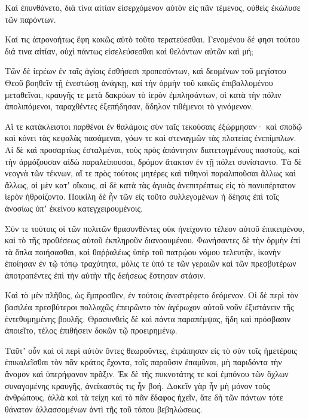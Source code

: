 {Καὶ ἐπυνθάνετο, διὰ τίνα αἰτίαν εἰσερχόμενον αὐτὸν εἰς πᾶν τέμενος, οὐθεὶς ἐκώλυσε τῶν παρόντων.
\par }{\PP {}Καί τις ἀπρονοήτως ἔφη κακῶς αὐτὸ τοῦτο τερατεύεσθαι.
Γενομένου δέ φησι τούτου διά τινα αἰτίαν, οὐχὶ πάντως εἰσελεύσεσθαι καὶ θελόντων αὐτῶν καὶ μή;
\par }{\PP {}Τῶν δὲ ἱερέων ἐν ταῖς ἁγίαις ἐσθήσεσι προπεσόντων, καὶ δεομένων τοῦ μεγίστου Θεοῦ βοηθεῖν τῇ ἐνεστώσῃ ἀνάγκῃ, καί τὴν ὁρμὴν τοῦ κακῶς ἐπιβαλλομένου μεταθεῖναι, κραυγῆς τε μετὰ δακρύων τὸ ἱερὸν ἐμπλησάντων,
οἱ κατὰ τὴν πόλιν ἀπολιπόμενοι, ταραχθέντες ἐξεπήδησαν, ἄδηλον τιθέμενοι τὸ γινόμενον.
\par }{\PP {}Αἵ τε κατάκλειστοι παρθένοι ἐν θαλάμοις σὺν ταῖς τεκούσαις ἐξώρμησαν· καὶ σποδῷ καὶ κόνει τὰς κεφαλὰς πασάμεναι, γόων τε καὶ στεναγμῶν τὰς πλατείας ἐνεπίμπλων.
Αἱ δὲ καὶ προσαρτίως ἐσταλμέναι, τοὺς πρὸς ἀπάντησιν διατεταγμένους παστοὺς, καὶ τὴν ἁρμόζουσαν αἰδὼ παραλείπουσαι, δρόμον ἄτακτον ἐν τῇ πόλει συνίσταντο.
Τὰ δὲ νεογνὰ τῶν τέκνων, αἵ τε πρὸς τούτοις μητέρες καὶ τιθηνοὶ παραλιποῦσαι ἄλλως καὶ ἄλλως, αἱ μὲν κατʼ οἴκους, αἱ δὲ κατὰ τὰς ἀγυιὰς ἀνεπιτρέπτως εἰς τὸ πανυπέρτατον ἱερὸν ἠθροίζοντο.
Ποικίλη δὲ ἦν τῶν εἰς τοῦτο συλλεγομένων ἡ δέησις ἐπὶ τοῖς ἀνοσίως ὑπʼ ἐκείνου κατεγχειρουμένοις.
\par }{\PP {}Σύν τε τούτοις οἱ τῶν πολιτῶν θρασυνθέντες οὐκ ἠνείχοντο τέλεον αὐτοῦ ἐπικειμένου, καὶ τὸ τῆς προθέσεως αὐτοῦ ἐκπληροῦν διανοουμένου.
Φωνήσαντες δὲ τὴν ὁρμὴν ἐπὶ τὰ ὅπλα ποιήσασθαι, καὶ θαῤῥαλέως ὑπὲρ τοῦ πατρῴου νόμου τελευτᾷν, ἱκανὴν ἐποίησαν ἐν τῷ τόπῳ τραχύτητα, μόλις τε ὑπό τε τῶν γεραιῶν καὶ τῶν πρεσβυτέρων ἀποτραπέντες ἐπὶ τὴν αὐτὴν τῆς δεήσεως ἔστησαν στάσιν.
\par }{\PP {}Καὶ τὸ μὲν πλῆθος, ὡς ἔμπροσθεν, ἐν τούτοις ἀνεστρέφετο δεόμενον.
Οἱ δὲ περὶ τὸν βασιλέα πρεσβύτεροι πολλαχῶς ἐπειρῶντο τὸν ἀγέρωχον αὐτοῦ νοῦν ἐξιστάνειν τῆς ἐντεθυμημένης βουλῆς.
Θρασυνθεὶς δὲ καὶ πάντα παραπέμψας, ἤδη καὶ πρόσβασιν ἀποιεῖτο, τέλος ἐπιθήσειν δοκῶν τῷ προειρημένῳ.
\par }{\PP {}Ταῦτʼ οὖν καὶ οἱ περὶ αὐτὸν ὄντες θεωροῦντες, ἐτράπησαν εἰς τὸ σὺν τοῖς ἡμετέροις ἐπικαλεῖσθαι τὸν πᾶν κράτος ἔχοντα, τοῖς παροῦσιν ἐπαμῦναι, μὴ παριδόντα τὴν ἄνομον καὶ ὑπερήφανον πρᾶξιν.
Ἐκ δὲ τῆς πυκνοτάτης τε καὶ ἐμπόνου τῶν ὄχλων συναγομένης κραυγῆς, ἀνείκαστός τις ἦν βοή.
Δοκεῖν γὰρ ἦν μὴ μόνον τοὺς ἀνθρώπους, ἀλλὰ καὶ τὰ τείχη καὶ τὸ πᾶν ἔδαφος ἠχεῖν, ἅτε δὴ τῶν πάντων τότε θάνατον ἀλλασσομένων ἀντὶ τῆς τοῦ τόπου βεβηλώσεως.

}
